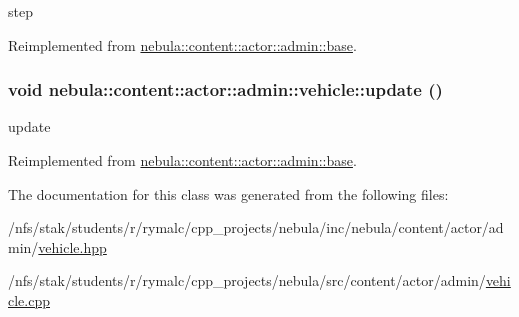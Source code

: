 step 

Reimplemented from \hyperlink{classnebula_1_1content_1_1actor_1_1admin_1_1base_ac66cc3aa153fa2d6e45f1195d2027052}{nebula::content::actor::admin::base}.\hypertarget{classnebula_1_1content_1_1actor_1_1admin_1_1vehicle_afbb178d770e59c7d211df86d63bb9303}{
\subsubsection[{update}]{\setlength{\rightskip}{0pt plus 5cm}void nebula::content::actor::admin::vehicle::update ()}}
\label{classnebula_1_1content_1_1actor_1_1admin_1_1vehicle_afbb178d770e59c7d211df86d63bb9303}


update 

Reimplemented from \hyperlink{classnebula_1_1content_1_1actor_1_1admin_1_1base_a1401d047ad4b2459a047644da275cebf}{nebula::content::actor::admin::base}.

The documentation for this class was generated from the following files:\begin{DoxyCompactItemize}
\item 
/nfs/stak/students/r/rymalc/cpp\_\-projects/nebula/inc/nebula/content/actor/admin/\hyperlink{admin_2vehicle_8hpp}{vehicle.hpp}\item 
/nfs/stak/students/r/rymalc/cpp\_\-projects/nebula/src/content/actor/admin/\hyperlink{admin_2vehicle_8cpp}{vehicle.cpp}\end{DoxyCompactItemize}
